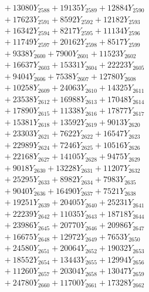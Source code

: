 \documentclass[a4paper,10pt]{article}
\begin{document}
{\begin{align}
&\;  + 13080 Y_{2588} + 19135 Y_{2589} + 12884 Y_{2590} \\[0.3ex]
&\;  + 17623 Y_{2591} + 8592 Y_{2592} + 12182 Y_{2593} \\[0.3ex]
&\;  + 16342 Y_{2594} + 8217 Y_{2595} + 11134 Y_{2596} \\[0.3ex]
&\;  + 11749 Y_{2597} + 20162 Y_{2598} + 8517 Y_{2599} \\[0.3ex]
&\;  + 9338 Y_{2600} + 7900 Y_{2601} + 11523 Y_{2602} \\[0.3ex]
&\;  + 16637 Y_{2603} + 15331 Y_{2604} + 22223 Y_{2605} \\[0.3ex]
&\;  + 9404 Y_{2606} + 7538 Y_{2607} + 12780 Y_{2608} \\[0.5ex]\allowbreak
&\;  + 10258 Y_{2609} + 24063 Y_{2610} + 14325 Y_{2611} \\[0.3ex]
&\;  + 23538 Y_{2612} + 16988 Y_{2613} + 17048 Y_{2614} \\[0.3ex]
&\;  + 17890 Y_{2615} + 11338 Y_{2616} + 17877 Y_{2617} \\[0.3ex]
&\;  + 15381 Y_{2618} + 13592 Y_{2619} + 9013 Y_{2620} \\[0.3ex]
&\;  + 23303 Y_{2621} + 7622 Y_{2622} + 16547 Y_{2623} \\[0.3ex]
&\;  + 22989 Y_{2624} + 7246 Y_{2625} + 10516 Y_{2626} \\[0.3ex]
&\;  + 22168 Y_{2627} + 14105 Y_{2628} + 9475 Y_{2629} \\[0.3ex]
&\;  + 9018 Y_{2630} + 13228 Y_{2631} + 11207 Y_{2632} \\[0.3ex]
&\;  + 25295 Y_{2633} + 8982 Y_{2634} + 7983 Y_{2635} \\[0.3ex]
&\;  + 9040 Y_{2636} + 16490 Y_{2637} + 7521 Y_{2638} \\[0.5ex]\allowbreak
&\;  + 19251 Y_{2639} + 20405 Y_{2640} + 25231 Y_{2641} \\[0.3ex]
&\;  + 22239 Y_{2642} + 11035 Y_{2643} + 18718 Y_{2644} \\[0.3ex]
&\;  + 23986 Y_{2645} + 20770 Y_{2646} + 20986 Y_{2647} \\[0.3ex]
&\;  + 16675 Y_{2648} + 12972 Y_{2649} + 7653 Y_{2650} \\[0.3ex]
&\;  + 24580 Y_{2651} + 20064 Y_{2652} + 19032 Y_{2653} \\[0.3ex]
&\;  + 18552 Y_{2654} + 13443 Y_{2655} + 12994 Y_{2656} \\[0.3ex]
&\;  + 11260 Y_{2657} + 20304 Y_{2658} + 13047 Y_{2659} \\[0.3ex]
&\;  + 24780 Y_{2660} + 11700 Y_{2661} + 17328 Y_{2662} \\[0.3ex]

\end{align}}
\end{document}
